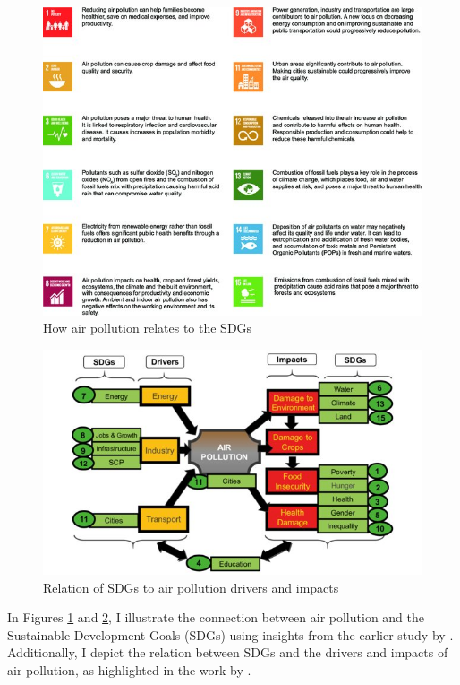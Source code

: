 \begin{figure}[tbh!]
    \centering
    \includegraphics[width=\textwidth]{figs/chap2/How-air-pollution-relates-to-the-UN-Sustainable-Development-Goals_W640.jpg}
    \caption{How air pollution relates to the SDGs \citep{aq2017eu}}
    \label{fig:chap2_fig3}
\end{figure}
\begin{figure}[tbh!]
    \centering
    \includegraphics[width=\textwidth]{figs/chap2/Relation-of-SDGs-to-Air-Pollutions-Drivers-and-Impacts.jpg}
    \caption[Relation of SDGs to air pollution drivers and impacts]{Relation of SDGs to air pollution drivers and impacts \citep{elder2016strengthening}}
    \label{fig:chap2_fig4}
\end{figure}
In Figures \ref{fig:chap2_fig3} and \ref{fig:chap2_fig4}, I illustrate the connection between air pollution and the Sustainable Development Goals (SDGs) using insights from the earlier study by \citep{aq2017eu}. Additionally, I depict the relation between SDGs and the drivers and impacts of air pollution, as highlighted in the work by \citep{elder2016strengthening}. 
